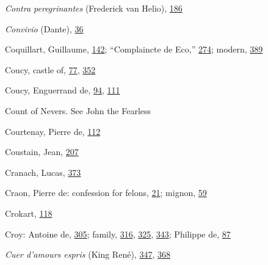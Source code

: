 \emph{Contra peregrinantes} (Frederick van Helio),
\protect\hyperlink{13_Chapter_Six__THE_DEPICTION_OF_TH.xhtmlux5cux23page_186}{186}

\emph{Convivio} (Dante),
\protect\hyperlink{09_Chapter_Two__THE_CRAVING_FOR_A_M.xhtmlux5cux23page_36}{36}

Coquillart, Guillaume,
\protect\hyperlink{11_Chapter_Four__THE_FORMS_OF_LOVE.xhtmlux5cux23page_142}{142};
``Complaincte de Eco,''
\protect\hyperlink{18_Chapter_Eleven__THE_FORMS_OF_THO.xhtmlux5cux23page_274}{274};
modern,
\protect\hyperlink{22_Chapter_Fourteen__THE_COMING_OF.xhtmlux5cux23page_389}{389}

Coucy, castle of,
\protect\hyperlink{10_Chapter_Three__THE_HEROIC_DREAM.xhtmlux5cux23page_77}{77},
\protect\hyperlink{21_Chapter_Thirteen__IMAGE_AND_WORD.xhtmlux5cux23page_352}{352}

Coucy, Enguerrand de,
\protect\hyperlink{10_Chapter_Three__THE_HEROIC_DREAM.xhtmlux5cux23page_94}{94},
\protect\hyperlink{10_Chapter_Three__THE_HEROIC_DREAM.xhtmlux5cux23page_111}{111}

Count of Nevers. See John the Fearless

Courtenay, Pierre de,
\protect\hyperlink{10_Chapter_Three__THE_HEROIC_DREAM.xhtmlux5cux23page_112}{112}

Coustain, Jean,
\protect\hyperlink{14_Chapter_Seven__THE_PIOUS_PERSONA.xhtmlux5cux23page_207}{207}

Cranach, Lucas,
\protect\hyperlink{21_Chapter_Thirteen__IMAGE_AND_WORD.xhtmlux5cux23page_373}{373}

Craon, Pierre de: confession for felons,
\protect\hyperlink{08_Chapter_One__THE_PASSIONATE_INTE.xhtmlux5cux23page_21}{21};
mignon,
\protect\hyperlink{09_Chapter_Two__THE_CRAVING_FOR_A_M.xhtmlux5cux23page_59}{59}

Crokart,
\protect\hyperlink{10_Chapter_Three__THE_HEROIC_DREAM.xhtmlux5cux23page_118}{118}

Croy: Antoine de,
\protect\hyperlink{20_ILLUSTRATIONS_FOLLOW_PAGE.xhtmlux5cux23page_305}{305};
family,
\protect\hyperlink{20_ILLUSTRATIONS_FOLLOW_PAGE.xhtmlux5cux23page_316}{316},
\protect\hyperlink{20_ILLUSTRATIONS_FOLLOW_PAGE.xhtmlux5cux23page_325}{325},
\protect\hyperlink{21_Chapter_Thirteen__IMAGE_AND_WORD.xhtmlux5cux23page_343}{343};
Philippe de,
\protect\hyperlink{10_Chapter_Three__THE_HEROIC_DREAM.xhtmlux5cux23page_87}{87}

\emph{Cuer d'amours espris} (King René),
\protect\hyperlink{21_Chapter_Thirteen__IMAGE_AND_WORD.xhtmlux5cux23page_347}{347},
\protect\hyperlink{21_Chapter_Thirteen__IMAGE_AND_WORD.xhtmlux5cux23page_368}{368}

